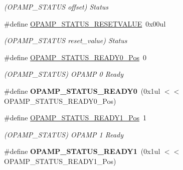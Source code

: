 \begin{DoxyCompactItemize}
\begin{DoxyCompactList}\small\item\em (O\+P\+A\+M\+P\+\_\+\+S\+T\+A\+T\+U\+S offset) Status \end{DoxyCompactList}\item 
\hypertarget{group___s_a_m_l21___o_p_a_m_p_ga5c12abe5599209c2c1210cb594e370c4}{}\#define \hyperlink{group___s_a_m_l21___o_p_a_m_p_ga5c12abe5599209c2c1210cb594e370c4}{O\+P\+A\+M\+P\+\_\+\+S\+T\+A\+T\+U\+S\+\_\+\+R\+E\+S\+E\+T\+V\+A\+L\+U\+E}~0x00ul\label{group___s_a_m_l21___o_p_a_m_p_ga5c12abe5599209c2c1210cb594e370c4}

\begin{DoxyCompactList}\small\item\em (O\+P\+A\+M\+P\+\_\+\+S\+T\+A\+T\+U\+S reset\+\_\+value) Status \end{DoxyCompactList}\item 
\hypertarget{group___s_a_m_l21___o_p_a_m_p_gab5ba3fafd1a0bed4cb7cd2a7a7b3b4c6}{}\#define \hyperlink{group___s_a_m_l21___o_p_a_m_p_gab5ba3fafd1a0bed4cb7cd2a7a7b3b4c6}{O\+P\+A\+M\+P\+\_\+\+S\+T\+A\+T\+U\+S\+\_\+\+R\+E\+A\+D\+Y0\+\_\+\+Pos}~0\label{group___s_a_m_l21___o_p_a_m_p_gab5ba3fafd1a0bed4cb7cd2a7a7b3b4c6}

\begin{DoxyCompactList}\small\item\em (O\+P\+A\+M\+P\+\_\+\+S\+T\+A\+T\+U\+S) O\+P\+A\+M\+P 0 Ready \end{DoxyCompactList}\item 
\hypertarget{group___s_a_m_l21___o_p_a_m_p_ga2d5d6d8df8c3263b9362900e1d158379}{}\#define {\bfseries O\+P\+A\+M\+P\+\_\+\+S\+T\+A\+T\+U\+S\+\_\+\+R\+E\+A\+D\+Y0}~(0x1ul $<$$<$ O\+P\+A\+M\+P\+\_\+\+S\+T\+A\+T\+U\+S\+\_\+\+R\+E\+A\+D\+Y0\+\_\+\+Pos)\label{group___s_a_m_l21___o_p_a_m_p_ga2d5d6d8df8c3263b9362900e1d158379}

\item 
\hypertarget{group___s_a_m_l21___o_p_a_m_p_gaef4cd2010735ba0fc17136e02c21b500}{}\#define \hyperlink{group___s_a_m_l21___o_p_a_m_p_gaef4cd2010735ba0fc17136e02c21b500}{O\+P\+A\+M\+P\+\_\+\+S\+T\+A\+T\+U\+S\+\_\+\+R\+E\+A\+D\+Y1\+\_\+\+Pos}~1\label{group___s_a_m_l21___o_p_a_m_p_gaef4cd2010735ba0fc17136e02c21b500}

\begin{DoxyCompactList}\small\item\em (O\+P\+A\+M\+P\+\_\+\+S\+T\+A\+T\+U\+S) O\+P\+A\+M\+P 1 Ready \end{DoxyCompactList}\item 
\hypertarget{group___s_a_m_l21___o_p_a_m_p_ga4cc97dc92367e4a9c8f7230561a9357c}{}\#define {\bfseries O\+P\+A\+M\+P\+\_\+\+S\+T\+A\+T\+U\+S\+\_\+\+R\+E\+A\+D\+Y1}~(0x1ul $<$$<$ O\+P\+A\+M\+P\+\_\+\+S\+T\+A\+T\+U\+S\+\_\+\+R\+E\+A\+D\+Y1\+\_\+\+Pos)\label{group___s_a_m_l21___o_p_a_m_p_ga4cc97dc92367e4a9c8f7230561a9357c}


\end{DoxyCompactItemize}
